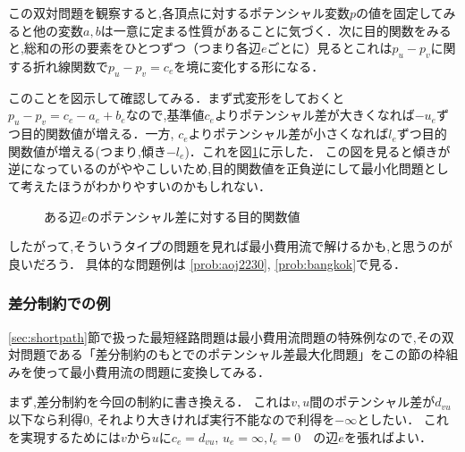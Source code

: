 \documentclass[13pt]{jarticle}
\theoremstyle{nonitalic} %
\begin{document}
この双対問題を観察すると,各頂点に対するポテンシャル変数$p$の値を固定してみると他の変数$a,b$は一意に定まる性質があることに気づく．次に目的関数をみると,総和の形の要素をひとつずつ（つまり各辺$e$ごとに）見るとこれは$p_u-p_v$に関する折れ線関数で$p_u-p_v=c_e$を境に変化する形になる．

このことを図示して確認してみる．まず式変形をしておくと$p_u-p_v = c_e - a_e + b_e$なので,基準値$c_e$よりポテンシャル差が大きくなれば$-u_e$ずつ目的関数値が増える．一方, $c_e$よりポテンシャル差が小さくなれば$l_e$ずつ目的関数値が増える(つまり,傾き$-l_e$)．これを図\ref{fig1}に示した． この図を見ると傾きが逆になっているのがややこしいため,目的関数値を正負逆にして最小化問題として考えたほうがわかりやすいのかもしれない．

\begin{figure}
\centering
{}
\caption{ある辺$e$のポテンシャル差に対する目的関数値}
\label{fig1}
\end{figure}

したがって,そういうタイプの問題を見れば最小費用流で解けるかも,と思うのが良いだろう．
具体的な問題例は \ref{prob:aoj2230}, \ref{prob:bangkok}で見る．

\subsubsection{差分制約での例}
\ref{sec:shortpath}節で扱った最短経路問題は最小費用流問題の特殊例なので,その双対問題である「差分制約のもとでのポテンシャル差最大化問題」をこの節の枠組みを使って最小費用流の問題に変換してみる．

まず,差分制約を今回の制約に書き換える．
これは$v,u$間のポテンシャル差が$d_{vu}$以下なら利得0, それより大きければ実行不能なので利得を$-\infty$としたい．
これを実現するためには$v$から$u$に$c_e=d_{vu}$, $u_e=\infty, l_e=0$　の辺$e$を張ればよい．
\end{document}
